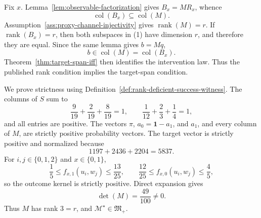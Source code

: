 Fix \(x\).  Lemma~\ref{lem:observable-factorization} gives \(B_x=MR_x\), whence
\[
\operatorname{col}(B_x)\subseteq\operatorname{col}(M).
\tag{1}
\]
Assumption~\ref{ass:proxy-channel-injectivity} gives \(\operatorname{rank}(M)=r\).  If \(\operatorname{rank}(B_x)=r\), then both subspaces in (1) have dimension \(r\), and therefore they are equal.  Since the same lemma gives \(b=Mq\),
\[
b\in\operatorname{col}(M)=\operatorname{col}(B_x).
\tag{2}
\]
Theorem~\ref{thm:target-span-iff} then identifies the intervention law.  Thus the published rank condition implies the target-span condition.

We prove strictness using Definition~\ref{def:rank-deficient-success-witness}.  The columns of \(S\) sum to
\[
\frac9{19}+\frac2{19}+\frac8{19}=1,
\qquad
\frac1{12}+\frac23+\frac14=1,
\tag{3}
\]
and all entries are positive.  The vectors \(\pi\), \(a_0=\mathbf 1-a_1\), and \(a_1\), and every column of \(M\), are strictly positive probability vectors.  The target vector is strictly positive and normalized because
\[
1197+2436+2204=5837.
\tag{4}
\]
For \(i,j\in\{0,1,2\}\) and \(x\in\{0,1\}\),
\[
\frac15\le f_{x,1}(u_i,w_j)\le\frac{13}{25},
\qquad
\frac{12}{25}\le f_{x,0}(u_i,w_j)\le\frac45,
\tag{5}
\]
so the outcome kernel is strictly positive.  Direct expansion gives
\[
\det(M)=\frac{49}{100}\ne0.
\tag{6}
\]
Thus \(M\) has rank \(3=r\), and \(\mathcal M^{\star}\in\mathfrak M_{+}\).

